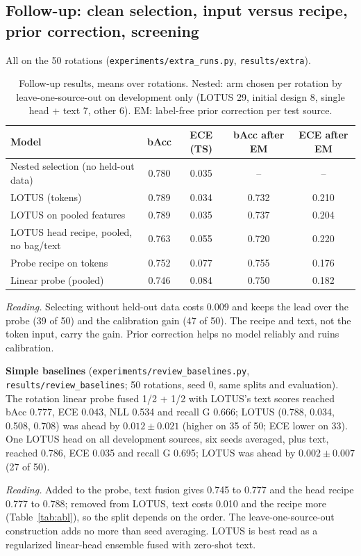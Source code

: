 \documentclass[runningheads]{llncs}
\newcommand{\reading}[1]{\par\noindent\textit{Reading.} #1\par\medskip}
\begin{document}
\subsection{Follow-up: clean selection, input versus recipe, prior correction, screening}\label{s:followup}
All on the 50 rotations (\texttt{experiments/extra\_runs.py}, \texttt{results/extra}).
\begin{table}[h]\caption{Follow-up results, means over rotations. Nested: arm chosen per rotation by leave-one-source-out on development only (LOTUS 29, initial design 8, single head + text 7, other 6). EM: label-free prior correction per test source.}\label{tab:followup}\centering\scriptsize
\begin{tabular}{lcccc}\toprule
Model & bAcc & ECE (TS) & bAcc after EM & ECE after EM\\\midrule
Nested selection (no held-out data) & 0.780 & 0.035 & -- & --\\
LOTUS (tokens) & 0.789 & 0.034 & 0.732 & 0.210\\
LOTUS on pooled features & 0.789 & 0.035 & 0.737 & 0.204\\
LOTUS head recipe, pooled, no bag/text & 0.763 & 0.055 & 0.720 & 0.220\\
Probe recipe on tokens & 0.752 & 0.077 & 0.755 & 0.176\\
Linear probe (pooled) & 0.746 & 0.084 & 0.750 & 0.182\\\bottomrule
\end{tabular}\end{table}
\reading{Selecting without held-out data costs 0.009 and keeps the lead over the probe (39 of 50) and the calibration gain (47 of 50). The recipe and text, not the token input, carry the gain. Prior correction helps no model reliably and ruins calibration.}

\textbf{Simple baselines} (\texttt{experiments/review\_baselines.py}, \texttt{results/review\_baselines}; 50 rotations, seed 0, same splits and evaluation). The rotation linear probe fused 1/2 + 1/2 with LOTUS's text scores reached bAcc 0.777, ECE 0.043, NLL 0.534 and recall G 0.666; LOTUS (0.788, 0.034, 0.508, 0.708) was ahead by $0.012\pm0.021$ (higher on 35 of 50; ECE lower on 33). One LOTUS head on all development sources, six seeds averaged, plus text, reached 0.786, ECE 0.035 and recall G 0.695; LOTUS was ahead by $0.002\pm0.007$ (27 of 50).
\reading{Added to the probe, text fusion gives 0.745 to 0.777 and the head recipe 0.777 to 0.788; removed from LOTUS, text costs 0.010 and the recipe more (Table~\ref{tab:abl}), so the split depends on the order. The leave-one-source-out construction adds no more than seed averaging. LOTUS is best read as a regularized linear-head ensemble fused with zero-shot text.}
\end{document}
